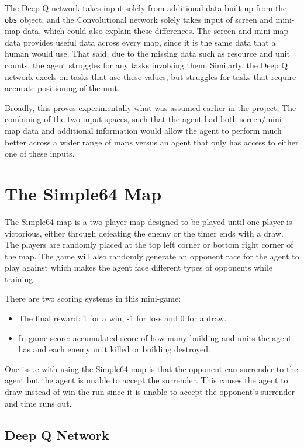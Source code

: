 The Deep Q network takes input solely from additional data built up from the
\texttt{obs} object, and the Convolutional network solely takes input of screen
and mini-map data, which could also explain these differences. The screen and
mini-map data provides useful data across every map, since it is the same data
that a human would use. That said, due to the missing data such as resource and
unit counts, the agent struggles for any tasks involving them. Similarly, the
Deep Q network excels on tasks that use these values, but struggles for tasks
that require accurate positioning of the unit.

Broadly, this proves experimentally what was assumed earlier in the project;
The combining of the two input spaces, such that the agent had both
screen/mini-map data and additional information would allow the agent to perform
much better across a wider range of maps versus an agent that only has access to
either one of these inputs.

\section{The Simple64 Map}

The Simple64 map is a two-player map designed to be played until one player is
victorious, either through defeating the enemy or the timer ends with a draw.
The players are randomly placed at the top left corner or bottom right corner of
the map. The game will also randomly generate an opponent race for the agent to
play against which makes the agent face different types of opponents while
training.

There are two scoring systems in this mini-game:

\begin{itemize}
    \item The final reward: 1 for a win, -1 for loss and 0 for a draw.
    \item In-game score: accumulated score of how many building and units the
        agent has and each enemy unit killed or building destroyed.
\end{itemize}

One issue with using the Simple64 map is that the opponent can surrender to the agent but the agent is unable to accept the surrender. This causes the agent to draw instead of win the run since it is unable to accept the opponent's surrender and time runs out.

\subsection{Deep Q Network}

